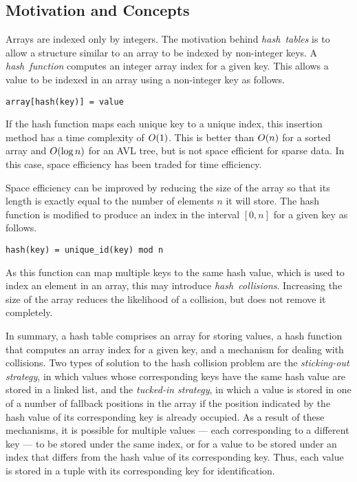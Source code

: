 \subsection{Motivation and Concepts}

Arrays are indexed only by integers.
The motivation behind \emph{hash~tables} is to allow a structure similar to an array to be indexed by non-integer keys.
A \emph{hash~function} computes an integer array index for a given key.
This allows a value to be indexed in an array using a non-integer key as follows.
\begin{lstlisting}[mathescape=true]
array[hash(key)] = value
\end{lstlisting}

If the hash function maps each unique key to a unique index, this insertion method has a time complexity of \( O\!\left(1\right) \).
This is better than \( O\!\left(n\right) \) for a sorted array and \( O\!\left(\log n\right) \) for an AVL tree, but is not space efficient for sparse data.
In this case, space efficiency has been traded for time efficiency.

Space efficiency can be improved by reducing the size of the array so that its length is exactly equal to the number of elements \( n \) it will store.
The hash function is modified to produce an index in the interval \( \left[ 0, n \right] \) for a given key as follows.
\begin{lstlisting}[mathescape=true]
hash(key) = unique_id(key) mod n
\end{lstlisting}
As this function can map multiple keys to the same hash value, which is used to index an element in an array, this may introduce \emph{hash~collisions}.
Increasing the size of the array reduces the likelihood of a collision, but does not remove it completely.

In summary, a hash table comprises an array for storing values, a hash function that computes an array index for a given key, and a mechanism for dealing with collisions.
Two types of solution to the hash collision problem are the \emph{sticking-out strategy}, in which values whose corresponding keys have the same hash value are stored in a linked list, and the \emph{tucked-in strategy}, in which a value is stored in one of a number of fallback positions in the array if the position indicated by the hash value of its corresponding key is already occupied.
As a result of these mechanisms, it is possible for multiple values --- each corresponding to a different key --- to be stored under the same index, or for a value to be stored under an index that differs from the hash value of its corresponding key.
Thus, each value is stored in a tuple with its corresponding key for identification.

